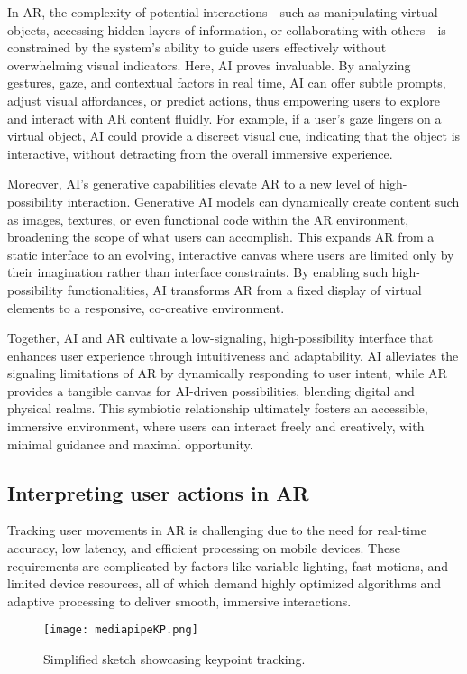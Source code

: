 In AR, the complexity of potential interactions—such as manipulating virtual objects, accessing hidden layers of information, or collaborating with others—is constrained by the system's ability to guide users effectively without overwhelming visual indicators.
Here, AI proves invaluable.
By analyzing gestures, gaze, and contextual factors in real time, AI can offer subtle prompts, adjust visual affordances, or predict actions, thus empowering users to explore and interact with AR content fluidly.
For example, if a user’s gaze lingers on a virtual object, AI could provide a discreet visual cue, indicating that the object is interactive, without detracting from the overall immersive experience.

Moreover, AI's generative capabilities elevate AR to a new level of high-possibility interaction.
Generative AI models can dynamically create content such as images, textures, or even functional code within the AR environment, broadening the scope of what users can accomplish.
This expands AR from a static interface to an evolving, interactive canvas where users are limited only by their imagination rather than interface constraints.
By enabling such high-possibility functionalities, AI transforms AR from a fixed display of virtual elements to a responsive, co-creative environment.

Together, AI and AR cultivate a low-signaling, high-possibility interface that enhances user experience through intuitiveness and adaptability.
AI alleviates the signaling limitations of AR by dynamically responding to user intent, while AR provides a tangible canvas for AI-driven possibilities, blending digital and physical realms.
This symbiotic relationship ultimately fosters an accessible, immersive environment, where users can interact freely and creatively, with minimal guidance and maximal opportunity.

\subsection{ Interpreting user actions in AR}

Tracking user movements in AR is challenging due to the need for real-time accuracy, low latency, and efficient processing on mobile devices.
These requirements are complicated by factors like variable lighting, fast motions, and limited device resources, all of which demand highly optimized algorithms and adaptive processing to deliver smooth, immersive interactions.

\begin{figure}[!h]
    \centering
    \texttt{[image: mediapipeKP.png]}
    \caption{Simplified sketch showcasing keypoint tracking.}
    \vspace{0.1cm}
    \label{fig:kptracking}
\end{figure}

